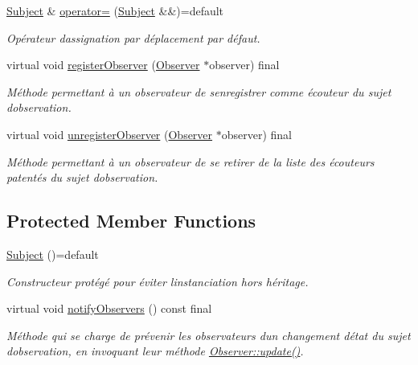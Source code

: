 \begin{DoxyCompactItemize}
\mbox{\hyperlink{classnvs_1_1_subject}{Subject}} \& \mbox{\hyperlink{classnvs_1_1_subject_afa3849e579c73fc54258f2b5ddd8317e}{operator=}} (\mbox{\hyperlink{classnvs_1_1_subject}{Subject}} \&\&)=default
\begin{DoxyCompactList}\small\item\em Opérateur d\textquotesingle{}assignation par déplacement par défaut. \end{DoxyCompactList}\item 
virtual void \mbox{\hyperlink{classnvs_1_1_subject_a4a476a25d1fa0db77f5ca86a6b0637f2}{register\+Observer}} (\mbox{\hyperlink{classnvs_1_1_observer}{Observer}} $\ast$observer) final
\begin{DoxyCompactList}\small\item\em Méthode permettant à un observateur de s\textquotesingle{}enregistrer comme écouteur du sujet d\textquotesingle{}observation. \end{DoxyCompactList}\item 
virtual void \mbox{\hyperlink{classnvs_1_1_subject_a749bc5b9a58ba0f72abbbce0f01f8a24}{unregister\+Observer}} (\mbox{\hyperlink{classnvs_1_1_observer}{Observer}} $\ast$observer) final
\begin{DoxyCompactList}\small\item\em Méthode permettant à un observateur de se retirer de la liste des écouteurs patentés du sujet d\textquotesingle{}observation. \end{DoxyCompactList}\end{DoxyCompactItemize}
\subsection*{Protected Member Functions}
\begin{DoxyCompactItemize}
\item 
\mbox{\label{classnvs_1_1_subject_a698aabcd0083be40995673ba4d887487}} 
\mbox{\hyperlink{classnvs_1_1_subject_a698aabcd0083be40995673ba4d887487}{Subject}} ()=default
\begin{DoxyCompactList}\small\item\em Constructeur protégé pour éviter l\textquotesingle{}instanciation hors héritage. \end{DoxyCompactList}\item 
virtual void \mbox{\hyperlink{classnvs_1_1_subject_ac0c7f6fc31ec3dd61c1e102cb565cdf9}{notify\+Observers}} () const final
\begin{DoxyCompactList}\small\item\em Méthode qui se charge de prévenir les observateurs d\textquotesingle{}un changement d\textquotesingle{}état du sujet d\textquotesingle{}observation, en invoquant leur méthode \mbox{\hyperlink{classnvs_1_1_observer_a4c0373c644180bdc48558e5248968b3a}{Observer\+::update()}}. \end{DoxyCompactList}\end{DoxyCompactItemize}
